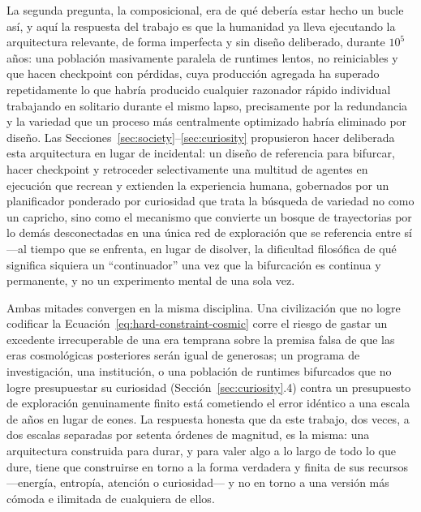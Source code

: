 \documentclass[11pt]{article}
\begin{document}
La segunda pregunta, la composicional, era de qué debería estar hecho un bucle así, y aquí la respuesta del trabajo es que la humanidad ya lleva ejecutando la arquitectura relevante, de forma imperfecta y sin diseño deliberado, durante $10^5$ años: una población masivamente paralela de runtimes lentos, no reiniciables y que hacen checkpoint con pérdidas, cuya producción agregada ha superado repetidamente lo que habría producido cualquier razonador rápido individual trabajando en solitario durante el mismo lapso, precisamente por la redundancia y la variedad que un proceso más centralmente optimizado habría eliminado por diseño. Las Secciones~\ref{sec:society}--\ref{sec:curiosity} propusieron hacer deliberada esta arquitectura en lugar de incidental: un diseño de referencia para bifurcar, hacer checkpoint y retroceder selectivamente una multitud de agentes en ejecución que recrean y extienden la experiencia humana, gobernados por un planificador ponderado por curiosidad que trata la búsqueda de variedad no como un capricho, sino como el mecanismo que convierte un bosque de trayectorias por lo demás desconectadas en una única red de exploración que se referencia entre sí —al tiempo que se enfrenta, en lugar de disolver, la dificultad filosófica de qué significa siquiera un ``continuador'' una vez que la bifurcación es continua y permanente, y no un experimento mental de una sola vez.

Ambas mitades convergen en la misma disciplina. Una civilización que no logre codificar la Ecuación~\ref{eq:hard-constraint-cosmic} corre el riesgo de gastar un excedente irrecuperable de una era temprana sobre la premisa falsa de que las eras cosmológicas posteriores serán igual de generosas; un programa de investigación, una institución, o una población de runtimes bifurcados que no logre presupuestar su curiosidad (Sección~\ref{sec:curiosity}.4) contra un presupuesto de exploración genuinamente finito está cometiendo el error idéntico a una escala de años en lugar de eones. La respuesta honesta que da este trabajo, dos veces, a dos escalas separadas por setenta órdenes de magnitud, es la misma: una arquitectura construida para durar, y para valer algo a lo largo de todo lo que dure, tiene que construirse en torno a la forma verdadera y finita de sus recursos —energía, entropía, atención o curiosidad— y no en torno a una versión más cómoda e ilimitada de cualquiera de ellos.
\end{document}
